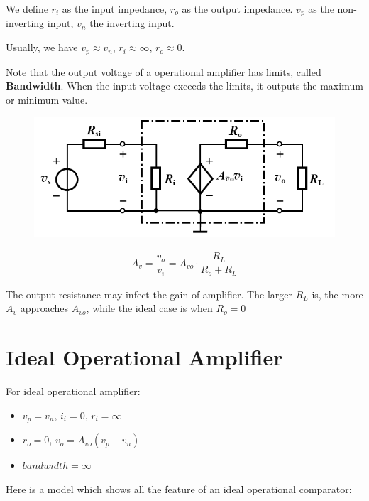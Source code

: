 We define $r_i$ as the input impedance, $r_o$ as the output impedance. $v_p$ as the non-inverting input, $v_n$  the inverting input.

Usually, we have $v_p \approx v_n$, $r_i \approx \infty$, $r_o \approx 0$.

Note that the output voltage of a operational amplifier has limits, called \textbf{Bandwidth}. When the input voltage exceeds the limits, it outputs the maximum or minimum value.

\begin{figure}[H]
  \centering
  \includegraphics[width=0.55\linewidth]{figures/op-amp-model}
\end{figure}

\begin{equation*}
  \begin{aligned}
    A_v = \dfrac{v_o}{v_i} = A_{vo} \cdot \dfrac{R_L}{R_o + R_L}  
  \end{aligned}
\end{equation*}

The output resistance may infect the gain of amplifier. The larger $R_L$ is, the more $A_v$ approaches $A_{vo}$, while the ideal case is when $R_o = 0$

\section{Ideal Operational Amplifier}

For ideal operational amplifier:

\begin{itemize}
\item $v_p = v_n$, $i_i = 0$, $r_i = \infty$
\item $r_o = 0$, $v_o = A_{vo} \left( v_p - v_n \right)$
\item $bandwidth = \infty$
  
\end{itemize}

Here is a model which shows all the feature of an ideal operational comparator:

